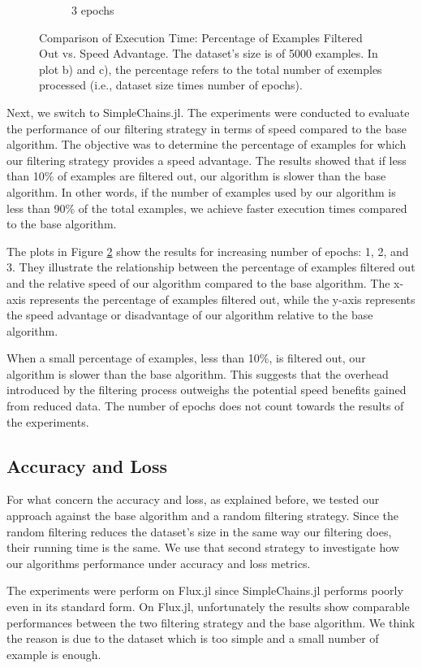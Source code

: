 \documentclass{article}
\begin{document}
\begin{figure}[htbp]
\begin{subfigure}[b]{0.3\textwidth}
        \caption{3 epochs}
        \label{fig:threshold3}
    \end{subfigure}
    \caption{Comparison of Execution Time: Percentage of Examples Filtered Out vs. Speed Advantage. The dataset's size is of 5000 examples. In plot b) and c), the percentage refers to the total number of exemples processed (i.e., dataset size times number of epochs).}
    \label{fig:threesholds}
\end{figure}

Next, we switch to SimpleChains.jl. The experiments were conducted to evaluate the performance of our filtering strategy in terms of speed compared to the base algorithm. The objective was to determine the percentage of examples for which our filtering strategy provides a speed advantage. The results showed that if less than 10\% of examples are filtered out, our algorithm is slower than the base algorithm. In other words, if the number of examples used by our algorithm is less than 90\% of the total examples, we achieve faster execution times compared to the base algorithm.

The plots in Figure \ref{fig:threesholds} show the results for increasing number of epochs: 1, 2, and 3.  They illustrate the relationship between the percentage of examples filtered out and the relative speed of our algorithm compared to the base algorithm. The x-axis represents the percentage of examples filtered out, while the y-axis represents the speed advantage or disadvantage of our algorithm relative to the base algorithm.

 When a small percentage of examples, less than 10\%, is filtered out, our algorithm is slower than the base algorithm. This suggests that the overhead introduced by the filtering process outweighs the potential speed benefits gained from reduced data. The number of epochs does not count towards the results of the experiments.

\subsection{Accuracy and Loss}
For what concern the accuracy and loss, as explained before, we tested our approach against the base algorithm and a random filtering strategy. Since the random filtering reduces the dataset's size in the same way our filtering does, their running time is the same. We use that second strategy to investigate how our algorithms performance under accuracy and loss metrics.

The experiments were perform on Flux.jl since SimpleChains.jl performs poorly even in its standard form. On Flux.jl, unfortunately the results show comparable performances between the two filtering strategy and the base algorithm. We think the reason is due to the dataset which is too simple and a small number of example is enough.
\end{document}
